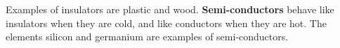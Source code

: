       \label{m38706*id66098} Examples of insulators are plastic and wood. \textbf{Semi-conductors} behave like insulators when they are cold, and like conductors when they are hot. The elements silicon and germanium are examples of semi-conductors. 

